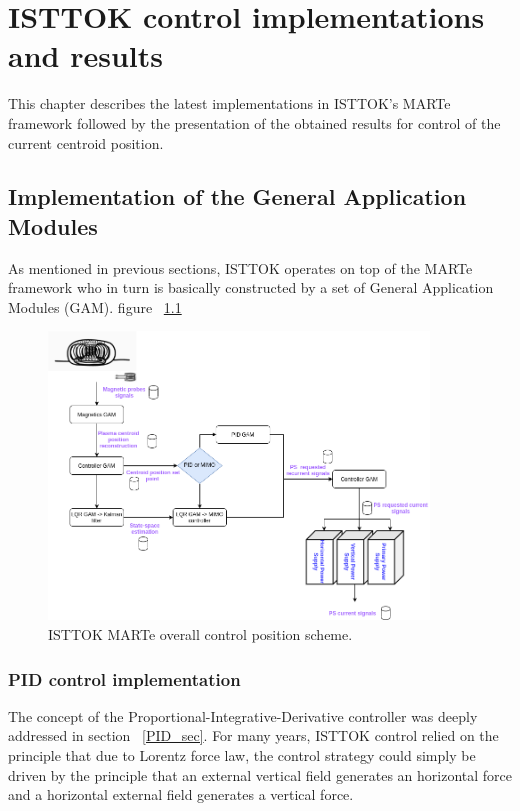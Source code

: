 \chapter{ISTTOK control implementations and results }

This chapter describes the latest implementations in ISTTOK's  MARTe framework followed by the presentation of the obtained results for control of the current centroid position.

\section{Implementation of the General Application Modules }

As mentioned in previous sections, ISTTOK operates on top of the MARTe framework who in turn is basically constructed by a set of General Application Modules (GAM).  figure ~\ref{GAMsDiags}

\begin{figure}
	\centering
	\includegraphics[width=0.9\textwidth]{Chp5/GAMsDiagram.png}	
	\caption{ISTTOK MARTe overall control position  scheme. \label{GAMsDiags}}
\end{figure}

\subsection{PID control implementation}

The concept of the Proportional-Integrative-Derivative controller was deeply addressed in section ~\ref{PID_sec}. For many years, ISTTOK control relied on the principle that due to Lorentz force law, the control strategy could simply be driven by the principle that an external vertical field  generates an horizontal force and a horizontal external field generates a vertical force. \smallskip  

